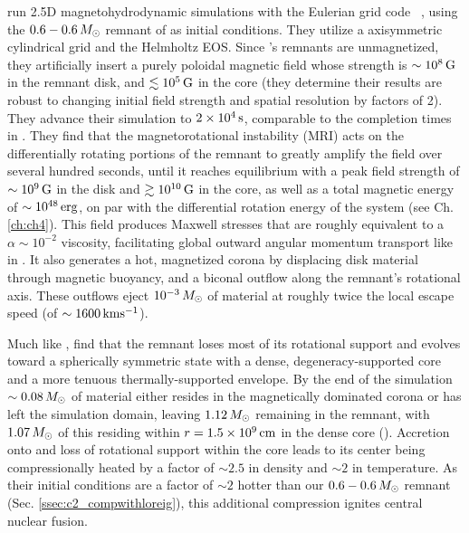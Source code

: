 \cite{ji+13} run 2.5D magnetohydrodynamic simulations with the Eulerian grid code \flash\ \citep{fryx+00}, using the $0.6 - 0.6\,\Msun$ remnant of \citeal{loreig09} as initial conditions.  They utilize a axisymmetric cylindrical grid and the Helmholtz EOS.  Since \citeal{loreig09}'s remnants are unmagnetized, they artificially insert a purely poloidal magnetic field whose strength is $\sim10^8\,\mathrm{G}$ in the remnant disk, and $\lesssim10^5\,\mathrm{G}$ in the core (they determine their results are robust to changing initial field strength and spatial resolution by factors of 2).  They advance their simulation to $2\times10^4\,\mathrm{s}$, comparable to the completion times in \cite{schw+12}.  They find that the magnetorotational instability (MRI) acts on the differentially rotating portions of the remnant to greatly amplify the field over several hundred seconds, until it reaches equilibrium with a peak field strength of $\sim10^9\,\mathrm{G}$ in the disk and $\gtrsim10^{10}\,\mathrm{G}$ in the core, as well as a total magnetic energy of $\sim10^{48}\,\mathrm{erg}$, on par with the differential rotation energy of the system (see Ch. \ref{ch:ch4}).  This field produces Maxwell stresses that are roughly equivalent to a $\alpha \sim 10^{-2}$ viscosity, facilitating global outward angular momentum transport like in \cite{schw+12}.  It also generates a hot, magnetized corona by displacing disk material through magnetic buoyancy, and a biconal outflow along the remnant's rotational axis.  These outflows eject $10^{-3}\,\Msun$ of material at roughly twice the local escape speed (of $\sim1600\,\mrm{km}\psec$).  

Much like \cite{schw+12}, \cite{ji+13} find that the remnant loses most of its rotational support and evolves toward a spherically symmetric state with a dense, degeneracy-supported core and a more tenuous thermally-supported envelope.  By the end of the simulation $\sim0.08\,\Msun$ of material either resides in the magnetically dominated corona or has left the simulation domain, leaving $1.12\,\Msun$ remaining in the remnant, with $1.07\,\Msun$ of this residing within $r = 1.5\times10^9\,\mathrm{cm}$ in the dense core (\bobjiprivcomm).  Accretion onto and loss of rotational support within the core leads to its center being compressionally heated by a factor of $\sim2.5$ in density and $\sim2$ in temperature.  As their initial conditions are a factor of $\sim2$ hotter than our $0.6 - 0.6\,\Msun$ remnant (Sec. \ref{ssec:c2_compwithloreig}), this additional compression ignites central nuclear fusion.

